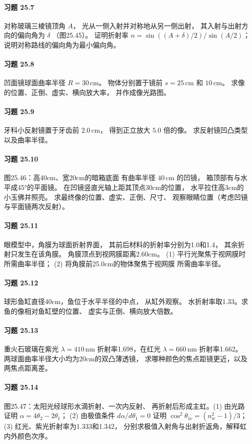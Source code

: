 \paragraph{习题 25.7}
对称玻璃三棱镜顶角 \(A\)，
光从一侧入射并对称地从另一侧出射，
其入射与出射方向的偏向角为 \(\delta\)
（图25.45）。
证明折射率
\(n=\sin((A+\delta)/2)/\sin(A/2)\)；
说明对称路线的偏向角为最小偏向角。
\paragraph{习题 25.8}
凹面镜球面曲率半径 \(R=30\,\mathrm{cm}\)。
物体分别置于镜前 \(s=25\,\mathrm{cm}\)
和 \(10\,\mathrm{cm}\)。
求像的位置、正倒、虚实、横向放大率，
并作成像光路图。
\paragraph{习题 25.9}
牙科小反射镜置于牙齿前 \(2.0\,\mathrm{cm}\)，
得到正立放大 \(5.0\) 倍的像。
求反射镜凹凸类型以及曲率半径。
\paragraph{习题 25.10}
图25.46：高40cm、宽20cm的暗箱底面
有曲率半径 \(40\,\mathrm{cm}\) 的凹镜，
箱顶部有与水平成45°的平面镜。
在凹镜竖直光轴上距其顶点30cm的位置，
水平拉住高3cm的小玉佛并照亮。
求最终像的位置、虚实、正倒、尺寸、
观察眼睛位置（考虑凹镜与平面镜两次反射）。
\paragraph{习题 25.11}
眼模型中，角膜为球面折射界面，
其前后材料的折射率分别为1.0和1.4，
其余折射只发生在该角膜。
角膜顶点到视网膜距离2.60cm。
(1) 平行光聚焦于视网膜时所需曲率半径；
(2) 将角膜前25.0cm的物体聚焦于视网膜
所需曲率半径。
\paragraph{习题 25.12}
球形鱼缸直径40cm，鱼位于水平半径的中点，
从缸外观察。
水折射率取1.33。求鱼的像相对鱼缸壁的位置、
虚实与正倒、横向放大倍数。
\paragraph{习题 25.13}
重火石玻璃在紫光 \(\lambda=410\,\mathrm{nm}\)
折射率1.698，在红光 \(\lambda=660\,\mathrm{nm}\)
折射率1.662。
两球面曲率半径大小均为20cm的双凸薄透镜，
求哪种颜色的焦点距镜更近，以及两焦点距离差。
\paragraph{习题 25.14}
图25.47：太阳光经球形水滴折射、一次内反射、
再折射后形成主虹。(1) 由光路证明
\(\alpha=4\theta_2-2\theta_1\)；
(2) 由极值条件 \(d\alpha/d\theta_1=0\)
证明 \(\cos^2\theta_{1c}=(n_w^2-1)/3\)；
(3) 红光、紫光折射率为1.333和1.342，
分别求极值入射角与出射折返角，解释虹内外颜色次序。
